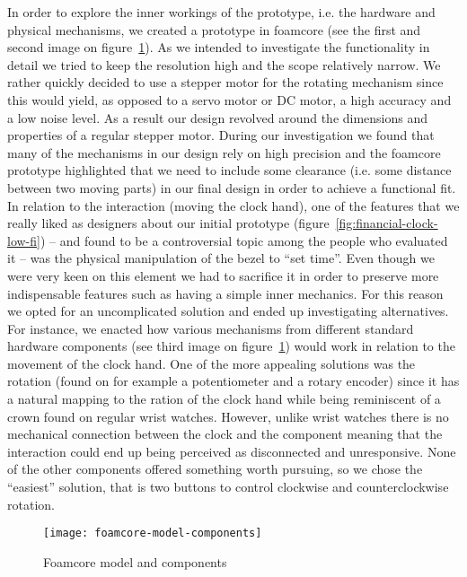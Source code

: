 In order to explore the inner workings of the prototype, i.e. the hardware and physical mechanisms, we created a prototype in foamcore (see the first and second image on figure~\ref{fig:foamcore-model-components}). As we intended to investigate the functionality in detail we tried to keep the resolution high and the scope relatively narrow. We rather quickly decided to use a stepper motor for the rotating mechanism since this would yield, as opposed to a servo motor or DC motor, a high accuracy and a low noise level. As a result our design revolved around the dimensions and properties of a regular stepper motor. During our investigation we found that many of the mechanisms in our design rely on high precision and the foamcore prototype highlighted that we need to include some clearance (i.e. some distance between two moving parts) in our final design in order to achieve a functional fit. In relation to the interaction (moving the clock hand), one of the features that we really liked as designers about our initial prototype (figure~\ref{fig:financial-clock-low-fi}) -- and found to be a controversial topic among the people who evaluated it -- was the physical manipulation of the bezel to “set time”. Even though we were very keen on this element we had to sacrifice it in order to preserve more indispensable features such as having a simple inner mechanics. For this reason we opted for an uncomplicated solution and ended up investigating alternatives. For instance, we enacted how various mechanisms from different standard hardware components (see third image on figure~\ref{fig:foamcore-model-components}) would work in relation to the movement of the clock hand. One of the more appealing solutions was the rotation (found on for example a potentiometer and a rotary encoder) since it has a natural mapping to the ration of the clock hand while being reminiscent of a crown found on regular wrist watches. However, unlike wrist watches there is no mechanical connection between the clock and the component meaning that the interaction could end up being perceived as disconnected and unresponsive. None of the other components offered something worth pursuing, so we chose the “easiest” solution, that is two buttons to control clockwise and counterclockwise rotation.

\begin{figure}[h]
	\centering
	\texttt{[image: foamcore-model-components]}
	\caption{Foamcore model and components}
	\label{fig:foamcore-model-components}
\end{figure}

